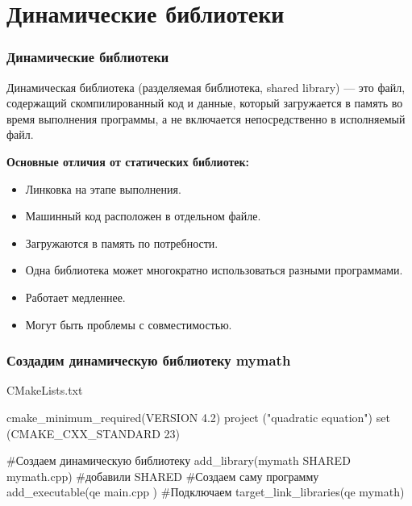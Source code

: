 \documentclass[9pt, aspectratio=1610]{beamer}
\begin{document}
\section {Динамические библиотеки}

\begin{frame}\frametitle{Динамические библиотеки}
	
	\begin{alertblock}{Динамическая библиотека (разделяемая библиотека, shared library) ---}
		 это файл, содержащий скомпилированный код и данные, который загружается в память во время выполнения программы, а не включается непосредственно в исполняемый файл.
	\end{alertblock}
	
	\textbf{Основные отличия от статических библиотек:}
	\begin{itemize}
		\item Линковка на этапе выполнения.
		\item Машинный код расположен в отдельном файле.
		\item Загружаются в память по потребности.
		\item Одна библиотека может многократно использоваться разными программами.
		\item Работает медленнее.
		\item Могут быть проблемы с совместимостью.
	\end{itemize}
	
\end{frame}

\begin{frame}[fragile]\frametitle{Создадим динамическую библиотеку mymath}
	
	\begin{block}{CMakeLists.txt}
		\begin{cmakecode}
			cmake_minimum_required(VERSION 4.2)
			project ("quadratic equation")
			set (CMAKE_CXX_STANDARD 23)
			
			#Создаем динамическую библиотеку
			add_library(mymath SHARED mymath.cpp) #добавили SHARED
			#Создаем саму программу
			add_executable(qe main.cpp )
			#Подключаем
			target_link_libraries(qe mymath)
		\end{cmakecode}
	\end{block}
	
	\pause
	
	
\end{frame}
\end{document}
